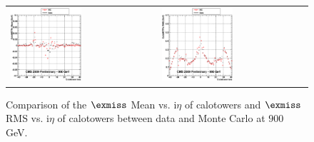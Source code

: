 \begin{figure}[h!]
 \centering
 \begin{tabular}{ll}
  \includegraphics[width=0.5\textwidth]{plots_DataVsMC_MB_900GeV/g_calometPxMean_vs_ieta_900.eps} &
  \includegraphics[width=0.5\textwidth]{plots_DataVsMC_MB_900GeV/g_calometPxRMS_vs_ieta_900.eps} \\
 \end{tabular}
 \caption{\small Comparison of the $\exmiss$ Mean vs. i$\eta$ of calotowers and $\exmiss$ RMS vs. i$\eta$ of calotowers between 
          data and Monte Carlo at $900$ GeV.\label{fig:METx_MeanRMS_vs_ieta_900}}
\end{figure}

